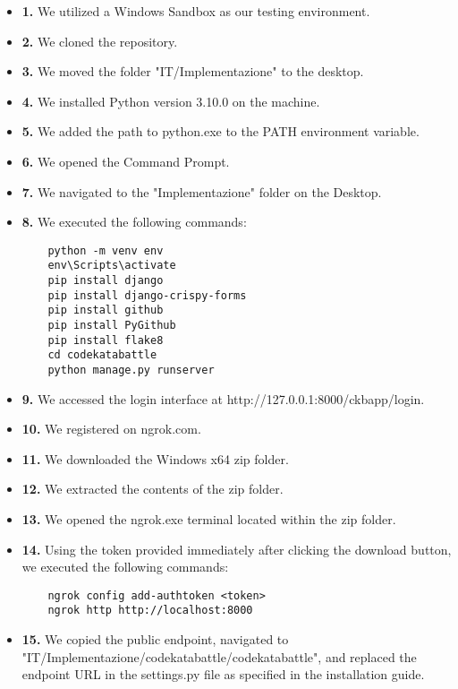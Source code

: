 \documentclass{Configuration_Files/Template}
\begin{document}
\begin{itemize}

    \item \textbf{1.} We utilized a Windows Sandbox as our testing environment.
    \item \textbf{2.} We cloned the repository.
    \item \textbf{3.} We moved the folder "IT/Implementazione" to the desktop.
    \item \textbf{4.} We installed Python version 3.10.0 on the machine.
    \item \textbf{5.} We added the path to python.exe to the PATH environment variable.
    \item \textbf{6.} We opened the Command Prompt.
    \item \textbf{7.} We navigated to the "Implementazione" folder on the Desktop.
    \item \textbf{8.} We executed the following commands:
    
    \begin{lstlisting}
    python -m venv env
    env\Scripts\activate
    pip install django
    pip install django-crispy-forms
    pip install github
    pip install PyGithub
    pip install flake8
    cd codekatabattle
    python manage.py runserver
    \end{lstlisting}
    
    \item \textbf{9.} We accessed the login interface at http://127.0.0.1:8000/ckbapp/login.
    \item \textbf{10.} We registered on ngrok.com.
    \item \textbf{11.} We downloaded the Windows x64 zip folder.
    \item \textbf{12.} We extracted the contents of the zip folder.
    \item \textbf{13.} We opened the ngrok.exe terminal located within the zip folder.
    \item \textbf{14.} Using the token provided immediately after clicking the download button, we executed the following commands:
    
    \begin{lstlisting}
    ngrok config add-authtoken <token>
    ngrok http http://localhost:8000
    \end{lstlisting}
    
    \item \textbf{15.} We copied the public endpoint, navigated to "IT/Implementazione/codekatabattle/codekatabattle", and replaced the endpoint URL in the settings.py file as specified in the installation guide.
    
\end{itemize}
\end{document}
